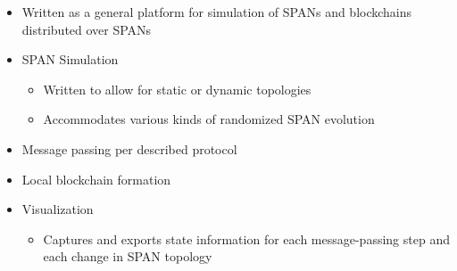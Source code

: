 \documentclass{beamer}
\begin{document}
\begin{frame}
\begin{columns}
		\begin{column}{0.7\textwidth}
			\centering
			\begin{itemize}
				\item Written as a general platform for simulation
					of SPANs and blockchains distributed over
					SPANs
				\item SPAN Simulation
					\begin{itemize}
						\item Written to allow for static or dynamic
							topologies
						\item Accommodates various kinds of randomized
							SPAN evolution
					\end{itemize}
				\item Message passing per described protocol
				\item Local blockchain formation
				\item Visualization
					\begin{itemize}
						\item Captures and exports state information for
							each message-passing step and each change in
							SPAN topology
					\end{itemize}
			\end{itemize}
		\end{column}
	\end{columns}	
\end{frame}
\end{document}
